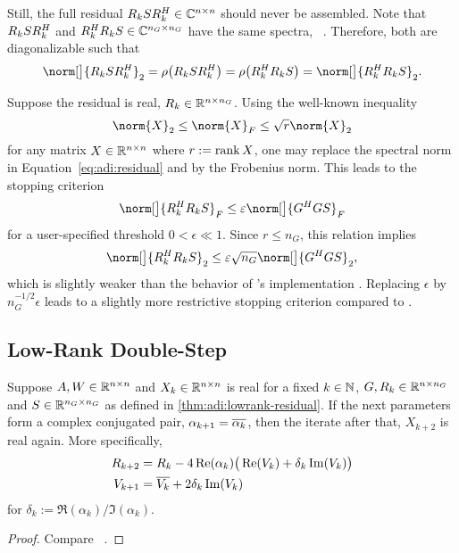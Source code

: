 Still, the full residual $R_k S R_k^H \in\mathbb{C}^{n\times n}$ should never be assembled.
Note that $R_k S R_k^H$ and $R_k^H R_k S \in \mathbb{C}^{n_G\times n_G}$ have the same spectra,
\cf~\cite[Remark on \pno~56]{Lang2015}.
Therefore, both are diagonalizable such that
\begin{equation}
\label{eq:adi:residual}
  \norm[\big]{R_k S R_k^\HT}_2
  = \rho\big( R_k S R_k^\HT \big)
  = \rho\big( R_k^\HT R_k S \big)
  = \norm[\big]{R_k^\HT R_k S}_2
  .
\end{equation}

Suppose the residual is real, \ie $R_k \in\mathbb{R}^{n\times n_G}$.
Using the well-known inequality
\begin{equation}
  \norm{X}_2
  \leq \norm{X}_F
  \leq \sqrt{r} \norm{X}_2
\end{equation}
for any matrix $X\in\mathbb{R}^{n\times n}$ where $r:=\operatorname{rank} X$,
one may replace the spectral norm in Equation~\eqref{eq:adi:residual} and \cite[Algorithm~2.2]{Lang2017}
by the Frobenius norm.
This leads to the stopping criterion
\begin{equation}
\label{eq:adi:lrstop}
  \norm[\big]{R_k^\HT R_k S}_F
  \leq
  \epsilon \norm[\big]{G^\HT G S}_F
\end{equation}
for a user-specified threshold $0<\epsilon \ll 1$.
Since $r \leq n_G$, this relation implies
\begin{equation}
  \norm[\big]{R_k^\HT R_k S}_2
  \leq
  \epsilon \sqrt{n_G} \norm[\big]{G^\HT G S}_2
  ,
\end{equation}
which is slightly weaker than the behavior of \citeauthor{Lang2017}'s implementation \cite{Lang2017}.
Replacing $\epsilon$ by $n_G^{-1/2} \epsilon$ leads to a slightly more restrictive stopping criterion compared to \cite{Lang2017}.

\subsection{Low-Rank Double-Step}
\label{sec:adi:lr2step}

\begin{proposition}
\label{thm:adi:ale:complex-pair}
  Suppose $A, W \in\mathbb{R}^{n\times n}$ and $X_k\in\mathbb{R}^{n\times n}$ is real for a fixed \mbox{$k\in\mathbb{N}$},
  \ie $G, R_k \in \mathbb{R}^{n\times n_G}$ and $S\in\mathbb{R}^{n_G\times n_G}$ as defined in \autoref{thm:adi:lowrank-residual}.
  If the next parameters form a complex conjugated pair,
  $\alpha_{k+1} = \conj{\alpha_k}$,
  then the iterate after that, $X_{k+2}$ is real again.
  More specifically,
  \begin{align*}
    R_{k+2} &= R_k - 4\Re(\alpha_k) \big(
      \Re(V_k) + \delta_k \Im(V_k)
    \big) \\
    V_{k+1} &= \conj{V_k} + 2\delta_k \Im(V_k)
  \end{align*}
  for $\delta_k := \Re(\alpha_k) / \Im(\alpha_k)$.
\end{proposition}
\begin{proof}
  Compare \citeauthor{Kuerschner2016}~\cite[Theorem~4.2]{Kuerschner2016}.
\end{proof}

